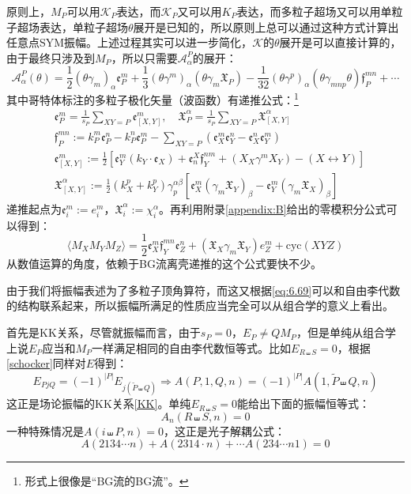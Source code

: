 原则上，$M_P$可以用$\mathcal{K}_P$表达，而$\mathcal{K}_P$又可以用$K_P$表达，而多粒子超场又可以用单粒子超场表达，单粒子超场$\theta$展开是已知的，所以原则上总可以通过这种方式计算出任意点SYM振幅。上述过程其实可以进一步简化，$\mathcal{K}$的$\theta$展开是可以直接计算的，由于最终只涉及到$M_P$，所以只需要$\mathcal{A}^P_\alpha$的展开：
\begin{equation}
	\mathcal{A}_\alpha^P(\theta)=\frac{1}{2}(\theta\gamma_m)_\alpha\mathfrak{e}_P^m+\frac{1}{3}(\theta\gamma^m)_\alpha(\theta\gamma_m\mathfrak{X}_P)-\frac{1}{32}(\theta\gamma^p)_\alpha(\theta\gamma_{mnp}\theta)\mathfrak{f}_P^{mn}+\cdots
\end{equation}
其中哥特体标注的多粒子极化矢量（波函数）有递推公式：\footnote{形式上很像是“BG流的BG流”。}
\begin{align*}
	&\mathfrak{e}_P^m=\frac{1}{s_P}\sum_{XY=P}\mathfrak{e}_{[X,Y]}^m,\quad\mathfrak{X}_P^\alpha=\frac{1}{s_P}\sum_{XY=P}\mathfrak{X}_{[X,Y]}^\alpha\\
	&\mathfrak{f}_P^{mn}:=k_P^m\mathfrak{e}_P^n-k_P^n\mathfrak{e}_P^m-\sum_{XY=P}\left(\mathfrak{e}_X^m\mathfrak{e}_Y^n-\mathfrak{e}_X^n\mathfrak{e}_Y^m\right)\\
	&\mathfrak{e}_{[X,Y]}^m:=\frac{1}{2}\left[\mathfrak{e}_Y^m(k_Y\cdot\mathfrak{e}_X)+\mathfrak{e}_n^X\mathfrak{f}_Y^{nm}+( X_X\gamma^m X_Y)-(X\leftrightarrow Y)\right]\\
	& \mathfrak{X}_{[X,Y]}^\alpha:=\frac{1}{2}(k_X^p+k_Y^p)\gamma_p^{\alpha\beta}\left[\mathfrak{e}_X^m(\gamma_m \mathfrak{X}_Y)_\beta-\mathfrak{e}_Y^m(\gamma_m \mathfrak{X}_X)_\beta\right]
\end{align*}
递推起点为$\mathfrak{e}_i^m:=e_i^m$，$\mathfrak{X}_i^\alpha:=\chi_i^\alpha$。再利用附录\ref{appendix:B}给出的零模积分公式可以得到：
\begin{equation}
	\label{eq:6.105}
	\langle M_XM_YM_Z\rangle=\frac{1}{2}\mathfrak{e}_X^m\mathfrak{f}_Y^{mn}\mathfrak{e}_Z^n+(\mathfrak{X}_X\gamma_m\mathfrak{X}_Y)e_Z^m+\mathrm{cyc}(XYZ)
\end{equation}
从数值运算的角度，依赖于BG流离壳递推的这个公式要快不少。\cite{Badger:2012uz}

由于我们将振幅表述为了多粒子顶角算符，而这又根据\ref{eq:6.69}可以和自由李代数的结构联系起来，所以振幅所满足的性质应当完全可以从组合学的意义上看出。

首先是KK关系，尽管就振幅而言，由于$s_P=0$，$E_P\neq QM_P$，但是单纯从组合学上说$E_P$应当和$M_P$一样满足相同的自由李代数恒等式。比如$E_{R\shuffle S} = 0$，根据\ref{schocker}同样对$E$得到：
\begin{equation}
	E_{PjQ}=(-1)^{|P|}E_{j(\tilde{P}\shuffle Q)}\Rightarrow A(P,1,Q,n)=(-1)^{|P|}A(1,\tilde{P}\shuffle Q,n)
\end{equation}
这正是场论振幅的KK关系\ref{KK}。单纯$E_{R\shuffle S} = 0$能给出下面的振幅恒等式：
\begin{equation}
	A_n(R\shuffle S,n) = 0
\end{equation}
一种特殊情况是$A(i\shuffle P,n)=0$，这正是光子解耦公式：\cite{Srednicki:2007qs}
\begin{equation}
	A(2134\cdots n)+ A(2314\cdot n)+\cdots A(234\cdots n 1) = 0
\end{equation}

